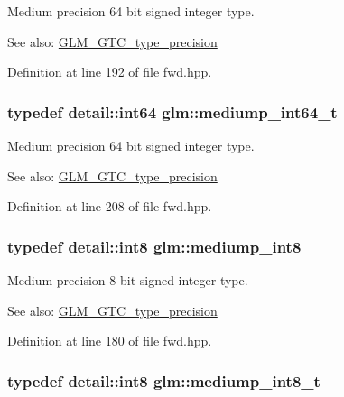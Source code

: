 Medium precision 64 bit signed integer type. \begin{Desc}
\item[See also:]\hyperlink{group__gtc__type__precision}{GLM\_\-GTC\_\-type\_\-precision} \end{Desc}


Definition at line 192 of file fwd.hpp.\hypertarget{group__gtc__type__precision_g555a2f85641550c232db473a9bb981f7}{
\subsubsection[mediump\_\-int64\_\-t]{\setlength{\rightskip}{0pt plus 5cm}typedef detail::int64 {\bf glm::mediump\_\-int64\_\-t}}}
\label{group__gtc__type__precision_g555a2f85641550c232db473a9bb981f7}


Medium precision 64 bit signed integer type. \begin{Desc}
\item[See also:]\hyperlink{group__gtc__type__precision}{GLM\_\-GTC\_\-type\_\-precision} \end{Desc}


Definition at line 208 of file fwd.hpp.\hypertarget{group__gtc__type__precision_g3ee8faab2278c44c5785af04b7b18a14}{
\subsubsection[mediump\_\-int8]{\setlength{\rightskip}{0pt plus 5cm}typedef detail::int8 {\bf glm::mediump\_\-int8}}}
\label{group__gtc__type__precision_g3ee8faab2278c44c5785af04b7b18a14}


Medium precision 8 bit signed integer type. \begin{Desc}
\item[See also:]\hyperlink{group__gtc__type__precision}{GLM\_\-GTC\_\-type\_\-precision} \end{Desc}


Definition at line 180 of file fwd.hpp.\hypertarget{group__gtc__type__precision_g626ac5f73d3538e62a879d6c56abfb36}{
\subsubsection[mediump\_\-int8\_\-t]{\setlength{\rightskip}{0pt plus 5cm}typedef detail::int8 {\bf glm::mediump\_\-int8\_\-t}}}
\label{group__gtc__type__precision_g626ac5f73d3538e62a879d6c56abfb36}


